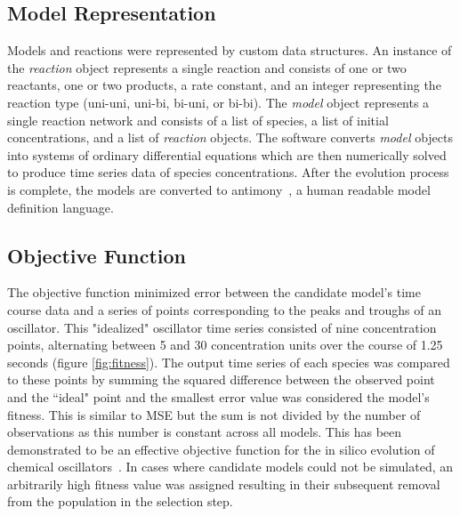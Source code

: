 \documentclass[12pt]{report}
\begin{document}
\subsection{Model Representation}

Models and reactions were represented by custom data structures. An instance of the \textit{reaction} object represents a single reaction and consists of one or two reactants, one or two products, a rate constant, and an integer representing the reaction type (uni-uni, uni-bi, bi-uni, or bi-bi). The \textit{model} object represents a single reaction network and consists of a list of species, a list of initial concentrations, and a list of \textit{reaction} objects. The software converts \textit{model} objects into systems of ordinary differential equations which are then numerically solved to produce time series data of species concentrations. After the evolution process is complete, the models are converted to antimony~\cite{Smith2009}, a human readable model definition language.

\subsection{Objective Function}

The objective function minimized error between the candidate model's time course data and a series of points corresponding to the peaks and troughs of an oscillator. This "idealized" oscillator time series consisted of nine concentration points, alternating between 5 and 30 concentration units over the course of 1.25 seconds (figure \ref{fig:fitness}). The output time series of each species was compared to these points by summing the squared difference between the observed point and the ``ideal" point and the smallest error value was considered the model's fitness. This is similar to MSE but the sum is not divided by the number of observations as this number is constant across all models. This has been demonstrated to be an effective objective function for the in silico evolution of chemical oscillators~\cite{Paladugu2006}.  In cases where candidate models could not be simulated, an arbitrarily high fitness value was assigned resulting in their subsequent removal from the population in the selection step.  
\end{document}
